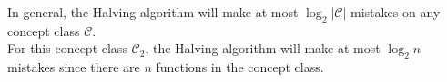 \begin{enumerate}
\begin{enumerate}
    {\color{red}
      In general, the Halving algorithm will make at most $\log_2|\mathcal{C}|$ mistakes on any concept class $\mathcal{C}$.\\
      For this concept class $\mathcal{C}_2$, the Halving algorithm will make at most $\log_2n$ mistakes since there are $n$ functions in the concept class.
    }

  \end{enumerate}

\end{enumerate}



